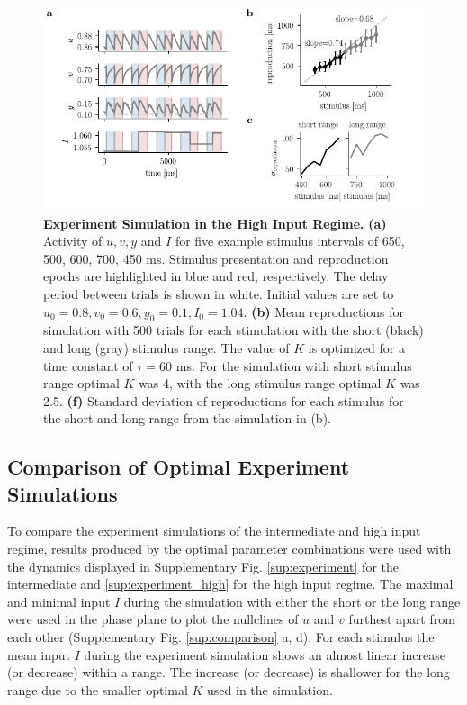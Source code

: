 \documentclass[10pt]{article}
\begin{document}
\begin{figure}[ht]
	\centering
	\includegraphics{figures/highI.pdf}
	\caption{\textbf{Experiment Simulation in the High Input Regime.} 
	\textbf{(a)} Activity of $u, v, y$ and $I$ for five example stimulus intervals of 650, 500, 600, 700, 450 ms. Stimulus presentation and reproduction epochs are highlighted in blue and red, respectively. The delay period between trials is shown in white. Initial values are set to $u_0=0.8 , v_0=0.6 , y_0=0.1, I_0=1.04$.
	\textbf{(b)} Mean reproductions for simulation with 500 trials for each stimulation with the short (black) and long (gray) stimulus range. The value of $K$ is optimized for a time constant of $\tau = 60$ ms. For the simulation with short
	stimulus range optimal $K$ was 4, with the long stimulus range optimal $K$ was 2.5.
	\textbf{(f)} Standard deviation of reproductions for each stimulus for the short and long range from the simulation in (b).
	}
\label{highI}
\end{figure}

\subsection{Comparison of Optimal Experiment Simulations}
To compare the experiment simulations of the intermediate and high input regime, results produced by the optimal parameter combinations were used with the dynamics displayed in Supplementary Fig. \ref{sup:experiment} for the intermediate and \ref{sup:experiment_high} for the high input regime.
The maximal and minimal input $I$ during the simulation with either the short or the long range were used in the phase plane to plot the nullclines of $u$ and $v$ furthest apart from each other (Supplementary Fig. \ref{sup:comparison} a, d).
For each stimulus the mean input $I$ during the experiment simulation shows an almost linear increase (or decrease) within a range. The increase (or decrease) is shallower for the long range due to the smaller optimal $K$ used in the simulation. 
\end{document}
